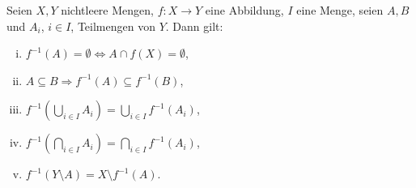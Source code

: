 \begin{theorem}
    Seien $X,Y$ nichtleere Mengen, $f:X \to Y$ eine Abbildung, $I$ eine Menge, seien $A,B$ und $A_i$, $i \in I$, Teilmengen von $Y$. Dann gilt: 
    \begin{enumerate}[(i)]
        \item 
        $f^{-1}(A) = \emptyset \iff A \cap f(X) = \emptyset$,
        \item 
        $A \subseteq B \Rightarrow f^{-1}(A) \subseteq f^{-1}(B)$,
        \item 
        $f^{-1}(\bigcup_{i \in I}A_i) = \bigcup_{i \in I}f^{-1}(A_i)$,
        \item 
        $f^{-1}(\bigcap_{i \in I}A_i) = \bigcap_{i \in I}f^{-1}(A_i)$,
        \item 
        $f^{-1}(Y \setminus A) = X \setminus f^{-1}(A)$.
    \end{enumerate}
\end{theorem}

\begin{proof*}
\end{proof*}

